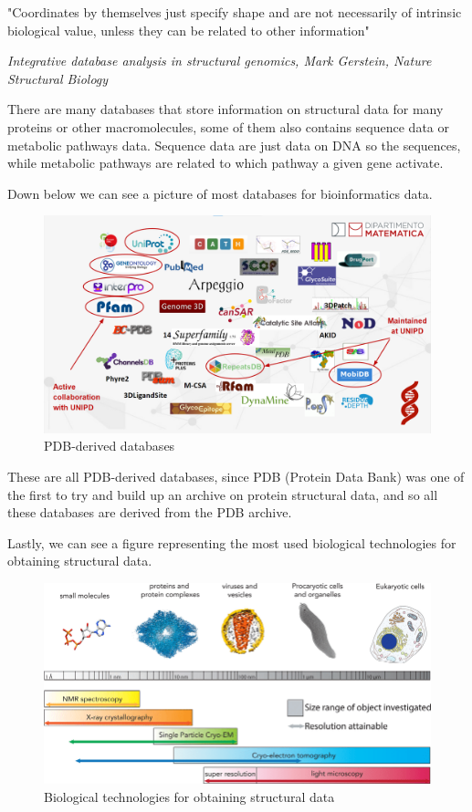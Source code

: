 \noindent "Coordinates by themselves just specify shape and are not necessarily of intrinsic biological value, unless they can be related to other information"

\noindent \small{\textit{Integrative database analysis in structural genomics, Mark Gerstein, Nature Structural Biology}}

\normalsize{There are many databases that store information on structural data for many proteins or other macromolecules, some of them also contains sequence data or metabolic pathways data. Sequence data are just data on DNA so the sequences, while metabolic pathways are related to which pathway a given gene activate.}

Down below we can see a picture of most databases for bioinformatics data.
\begin{figure}[h!]
    \centering
    \includegraphics[scale=0.3]{res/proteins_overview/pdb.png}
    \caption{PDB-derived databases}
\end{figure}

These are all PDB-derived databases, since PDB (Protein Data Bank) was one of the first to try and build up an archive on protein structural data, and so all these databases are derived from the PDB archive.

Lastly, we can see a figure representing the most used biological technologies for obtaining structural data.

\begin{figure}[h!]
    \centering
    \includegraphics[scale=0.6]{res/proteins_overview/methods_structural.png}
    \caption{Biological technologies for obtaining structural data}
\end{figure}

